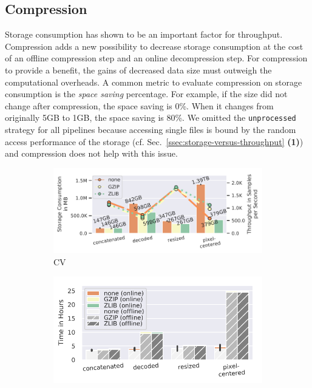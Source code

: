 {\color{diff}

\subsection{Compression}
\label{ssec:compression}

Storage consumption has shown to be an important factor for throughput.
Compression adds a new possibility to decrease storage consumption at the cost of an offline compression step and an online decompression step.
For compression to provide a benefit, the gains of decreased data size must outweigh the computational overheads.
A common metric to evaluate compression on storage consumption is the \textit{space saving} percentage.
For example, if the size did not change after compression, the space saving is 0\%.
When it changes from originally 5\:GB to 1\:GB, the space saving is 80\%.
We omitted the \texttt{unprocessed} strategy for all pipelines because accessing single files is bound by the random access performance of the storage (cf. Sec.~\ref{ssec:storage-versus-throughput} \textbf{(1)}) and compression does not help with this issue.
\begin{figure}
    \begin{subfigure}[c]{0.26\textwidth}
        \includegraphics[width=\textwidth]{figures/imagenet-pipeline/compressed-storage-vs-throughput.pdf}
        \vspace{-18pt}
        \caption{CV\footnotemark[1]}
        \label{fig:compressed-storage-vs-throughput-cv}
    \end{subfigure}
    \begin{subfigure}[c]{0.21\textwidth}
        \includegraphics[width=\textwidth]{figures/imagenet-pipeline/compression-processing-time-split.pdf}

\end{subfigure}
\end{figure}}
